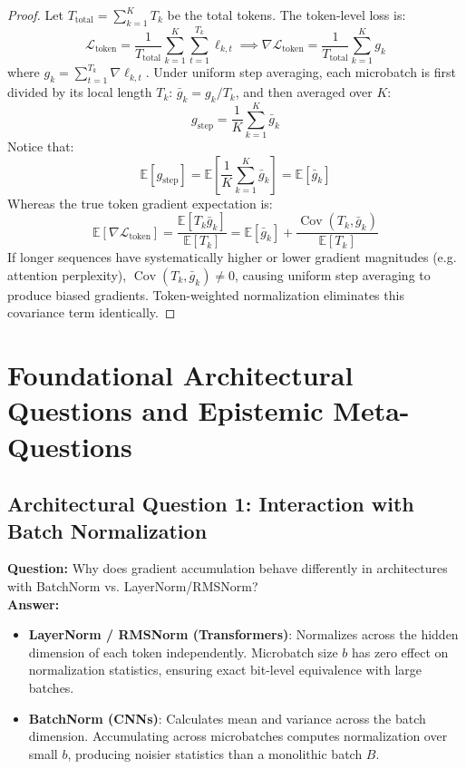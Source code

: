 \documentclass[11pt,a4paper]{article}
\theoremstyle{definition}
\begin{document}
\begin{proof}
Let $T_{\text{total}} = \sum_{k=1}^K T_k$ be the total tokens. The token-level loss is:
{\boldmath
\begin{equation}
\mathcal{L}_{\text{token}} = \frac{1}{T_{\text{total}}} \sum_{k=1}^K \sum_{t=1}^{T_k} \ell_{k, t} \implies \nabla \mathcal{L}_{\text{token}} = \frac{1}{T_{\text{total}}} \sum_{k=1}^K g_k
\end{equation}
}
where $g_k = \sum_{t=1}^{T_k} \nabla \ell_{k, t}$.
Under uniform step averaging, each microbatch is first divided by its local length $T_k$: $\bar{g}_k = g_k / T_k$, and then averaged over $K$:
{\boldmath
\begin{equation}
g_{\text{step}} = \frac{1}{K} \sum_{k=1}^K \bar{g}_k
\end{equation}
}
Notice that:
{\boldmath
\begin{equation}
\mathbb{E}[g_{\text{step}}] = \mathbb{E}\left[ \frac{1}{K} \sum_{k=1}^K \bar{g}_k \right] = \mathbb{E}[\bar{g}_k]
\end{equation}
}
Whereas the true token gradient expectation is:
{\boldmath
\begin{equation}
\mathbb{E}[\nabla \mathcal{L}_{\text{token}}] = \frac{\mathbb{E}[T_k \bar{g}_k]}{\mathbb{E}[T_k]} = \mathbb{E}[\bar{g}_k] + \frac{\operatorname{Cov}(T_k, \bar{g}_k)}{\mathbb{E}[T_k]}
\end{equation}
}
If longer sequences have systematically higher or lower gradient magnitudes (e.g. attention perplexity), $\operatorname{Cov}(T_k, \bar{g}_k) \neq 0$, causing uniform step averaging to produce biased gradients. Token-weighted normalization eliminates this covariance term identically.
\end{proof}

\section{Foundational Architectural Questions and Epistemic Meta-Questions}

\subsection{Architectural Question 1: Interaction with Batch Normalization}
\textbf{Question:} Why does gradient accumulation behave differently in architectures with BatchNorm vs. LayerNorm/RMSNorm?\\
\textbf{Answer:} 
\begin{itemize}
    \item \textbf{LayerNorm / RMSNorm (Transformers)}: Normalizes across the hidden dimension of each token independently. Microbatch size $b$ has zero effect on normalization statistics, ensuring exact bit-level equivalence with large batches.
    \item \textbf{BatchNorm (CNNs)}: Calculates mean and variance across the batch dimension. Accumulating across microbatches computes normalization over small $b$, producing noisier statistics than a monolithic batch $B$.
\end{itemize}
\end{document}
